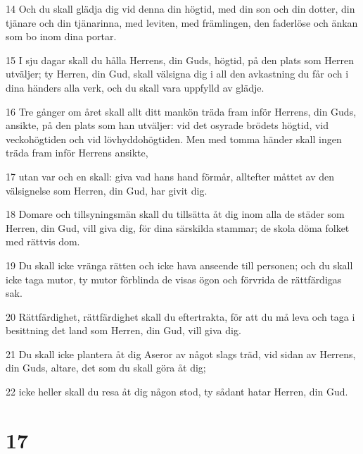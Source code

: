 \par 14 Och du skall glädja dig vid denna din högtid, med din son och din dotter, din tjänare och din tjänarinna, med leviten, med främlingen, den faderlöse och änkan som bo inom dina portar.
\par 15 I sju dagar skall du hålla Herrens, din Guds, högtid, på den plats som Herren utväljer; ty Herren, din Gud, skall välsigna dig i all den avkastning du får och i dina händers alla verk, och du skall vara uppfylld av glädje.
\par 16 Tre gånger om året skall allt ditt mankön träda fram inför Herrens, din Guds, ansikte, på den plats som han utväljer: vid det osyrade brödets högtid, vid veckohögtiden och vid lövhyddohögtiden. Men med tomma händer skall ingen träda fram inför Herrens ansikte,
\par 17 utan var och en skall: giva vad hans hand förmår, alltefter måttet av den välsignelse som Herren, din Gud, har givit dig.
\par 18 Domare och tillsyningsmän skall du tillsätta åt dig inom alla de städer som Herren, din Gud, vill giva dig, för dina särskilda stammar; de skola döma folket med rättvis dom.
\par 19 Du skall icke vränga rätten och icke hava anseende till personen; och du skall icke taga mutor, ty mutor förblinda de visas ögon och förvrida de rättfärdigas sak.
\par 20 Rättfärdighet, rättfärdighet skall du eftertrakta, för att du må leva och taga i besittning det land som Herren, din Gud, vill giva dig.
\par 21 Du skall icke plantera åt dig Aseror av något slags träd, vid sidan av Herrens, din Guds, altare, det som du skall göra åt dig;
\par 22 icke heller skall du resa åt dig någon stod, ty sådant hatar Herren, din Gud.

\chapter{17}

